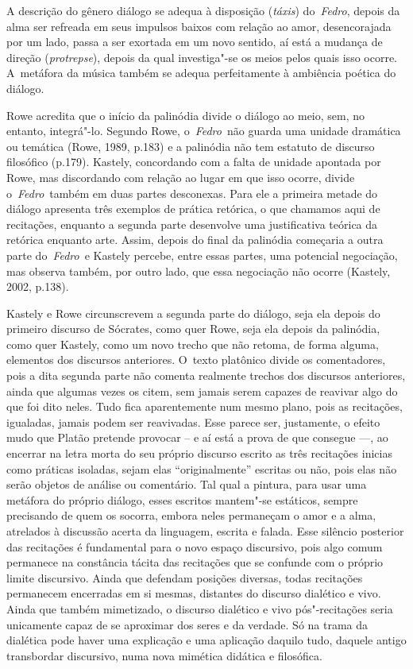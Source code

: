  

A descrição do gênero diálogo se adequa à disposição (\emph{táxis})
do~\emph{Fedro}, depois da alma ser refreada em seus impulsos baixos com
relação ao amor, desencorajada por um lado, passa a ser exortada em um
novo sentido, aí está a mudança de direção (\emph{protrepse}), depois da
qual investiga"-se os meios pelos quais isso ocorre. A~metáfora da música
também se adequa perfeitamente à ambiência poética do diálogo.

Rowe acredita que o início da palinódia divide o diálogo ao meio, sem,
no entanto, integrá"-lo. Segundo Rowe, o~\emph{Fedro}~não guarda uma
unidade dramática ou temática (Rowe, 1989, p.183) e a palinódia não tem
estatuto de discurso filosófico (p.179). Kastely, concordando com a
falta de unidade apontada por Rowe, mas discordando com relação ao lugar
em que isso ocorre, divide o~\emph{Fedro}~também em duas partes
desconexas. Para ele a primeira metade do diálogo apresenta três
exemplos de prática retórica, o que chamamos aqui de recitações,
enquanto a segunda parte desenvolve uma justificativa teórica da
retórica enquanto arte. Assim, depois do final da palinódia começaria a
outra parte do~\emph{Fedro}~e Kastely percebe, entre essas partes, uma
potencial negociação, mas observa também, por outro lado, que essa
negociação não ocorre (Kastely, 2002, p.138).

Kastely e Rowe circunscrevem a segunda parte do diálogo, seja ela depois
do primeiro discurso de Sócrates, como quer Rowe, seja ela depois da
palinódia, como quer Kastely, como um novo trecho que não retoma, de
forma alguma, elementos dos discursos anteriores. O~texto platônico
divide os comentadores, pois a dita segunda parte não comenta realmente
trechos dos discursos anteriores, ainda que algumas vezes os citem, sem
jamais serem capazes de reavivar algo do que foi dito neles. Tudo fica
aparentemente num mesmo plano, pois as recitações, igualadas, jamais
podem ser reavivadas. Esse parece ser, justamente, o efeito mudo que
Platão pretende provocar -- e aí está a prova de que consegue \mbox{---,} ao
encerrar na letra morta do seu próprio discurso escrito as três
recitações inicias como práticas isoladas, sejam elas ``originalmente''
escritas ou não, pois elas não serão objetos de análise ou comentário.
Tal qual a pintura, para usar uma metáfora do próprio diálogo, esses
escritos mantem"-se estáticos, sempre precisando de quem os socorra,
embora neles permaneçam o amor e a alma, atrelados à discussão acerta da
linguagem, escrita e falada. Esse silêncio posterior das recitações é
fundamental para o novo espaço discursivo, pois algo comum permanece na
constância tácita das recitações que se confunde com o próprio limite
discursivo. Ainda que defendam posições diversas, todas recitações
permanecem encerradas em si mesmas, distantes do discurso dialético e
vivo. Ainda que também mimetizado, o discurso dialético e vivo
pós"-recitações seria unicamente capaz de se aproximar dos seres e da
verdade. Só na trama da dialética pode haver uma explicação e uma
aplicação daquilo tudo, daquele antigo transbordar discursivo, numa nova
mimética didática e filosófica.

